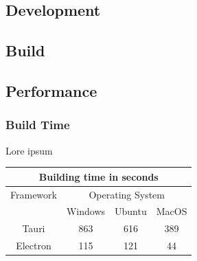 
\subsection{Development}
\label{subsec:impl:dev}

\subsection{Build}
\label{subsec:impl:build}

\label{tab:buildtime:statistics}

\subsection{Performance}
\label{subsec:impl:performance}
\subsubsection{Build Time}
\label{subsubsec:perf:buildtime}
Lore ipsum
\\
\begin{tabular} {| c | c | c | c |}

    \hline
    \multicolumn{4}{|c|}{Building time in seconds} \\ \hline
    Framework & \multicolumn{3}{|c|}{Operating System} \\ \hline
    & Windows & Ubuntu & MacOS \\ \hline
    Tauri & 863 & 616 & 389 \\ \hline
    Electron & 115 & 121 & 44 \\ \hline

\end{tabular} \\ \\
